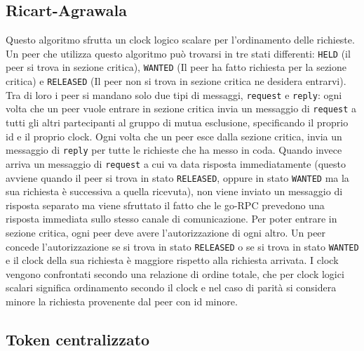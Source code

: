 \documentclass[conference]{IEEEtran}
\begin{document}
\subsection{Ricart-Agrawala}

Questo algoritmo sfrutta un clock logico scalare per l'ordinamento delle richieste. Un peer che utilizza questo algoritmo può trovarsi in tre stati differenti: 
\verb|HELD| (il peer si trova in sezione critica), \verb|WANTED| (Il peer ha fatto richiesta per la sezione critica) e \verb|RELEASED| (Il peer non si trova in sezione critica ne desidera entrarvi).
Tra di loro i peer si mandano solo due tipi di messaggi, \verb|request| e \verb|reply|: ogni volta che un peer vuole entrare in sezione critica invia un messaggio di \verb|request| a tutti gli altri partecipanti al gruppo di mutua esclusione, specificando il proprio id e il proprio clock. Ogni volta che un peer esce dalla sezione critica, invia un messaggio di \verb|reply| per tutte le richieste che ha messo in coda. Quando invece arriva un messaggio di \verb|request| a cui va data risposta immediatamente (questo avviene quando il peer si trova in stato \verb|RELEASED|, oppure in stato \verb|WANTED| ma la sua richiesta è successiva a quella ricevuta), non viene inviato un messaggio di risposta separato ma viene sfruttato il fatto che le go-RPC prevedono una risposta immediata sullo stesso canale di comunicazione. Per poter entrare in sezione critica, ogni peer deve avere l'autorizzazione di ogni altro. Un peer concede l'autorizzazione se si trova in stato \verb|RELEASED| o se si trova in stato \verb|WANTED| e il clock della sua richiesta è maggiore rispetto alla richiesta arrivata. I clock vengono confrontati secondo una relazione di ordine totale,  che per clock logici scalari significa ordinamento secondo il clock e nel caso di parità si considera minore la richiesta provenente dal peer con id minore.

\subsection{Token centralizzato}
\end{document}
